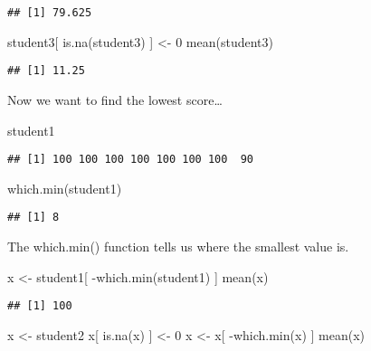 \documentclass[
]{article}
\newenvironment{Shaded}{\begin{snugshade}}{\end{snugshade}}
\newcommand{\DecValTok}[1]{\textcolor[rgb]{0.00,0.00,0.81}{#1}}
\newcommand{\FunctionTok}[1]{\textcolor[rgb]{0.00,0.00,0.00}{#1}}
\newcommand{\NormalTok}[1]{#1}
\newcommand{\OtherTok}[1]{\textcolor[rgb]{0.56,0.35,0.01}{#1}}
\newcommand{\SpecialCharTok}[1]{\textcolor[rgb]{0.00,0.00,0.00}{#1}}
\begin{document}
\begin{verbatim}
## [1] 79.625
\end{verbatim}

\begin{Shaded}
\begin{Highlighting}[]
\NormalTok{student3[ }\FunctionTok{is.na}\NormalTok{(student3) ] }\OtherTok{\textless{}{-}} \DecValTok{0}
\FunctionTok{mean}\NormalTok{(student3)}
\end{Highlighting}
\end{Shaded}

\begin{verbatim}
## [1] 11.25
\end{verbatim}

Now we want to find the lowest score\ldots{}

\begin{Shaded}
\begin{Highlighting}[]
\NormalTok{student1}
\end{Highlighting}
\end{Shaded}

\begin{verbatim}
## [1] 100 100 100 100 100 100 100  90
\end{verbatim}

\begin{Shaded}
\begin{Highlighting}[]
\FunctionTok{which.min}\NormalTok{(student1)}
\end{Highlighting}
\end{Shaded}

\begin{verbatim}
## [1] 8
\end{verbatim}

The which.min() function tells us where the smallest value is.

\begin{Shaded}
\begin{Highlighting}[]
\NormalTok{x }\OtherTok{\textless{}{-}}\NormalTok{ student1[ }\SpecialCharTok{{-}}\FunctionTok{which.min}\NormalTok{(student1) ]}
\FunctionTok{mean}\NormalTok{(x)}
\end{Highlighting}
\end{Shaded}

\begin{verbatim}
## [1] 100
\end{verbatim}

\begin{Shaded}
\begin{Highlighting}[]
\NormalTok{x }\OtherTok{\textless{}{-}}\NormalTok{ student2}
\NormalTok{x[ }\FunctionTok{is.na}\NormalTok{(x) ] }\OtherTok{\textless{}{-}} \DecValTok{0}
\NormalTok{x }\OtherTok{\textless{}{-}}\NormalTok{ x[ }\SpecialCharTok{{-}}\FunctionTok{which.min}\NormalTok{(x) ]}
\FunctionTok{mean}\NormalTok{(x)}
\end{Highlighting}
\end{Shaded}
\end{document}
